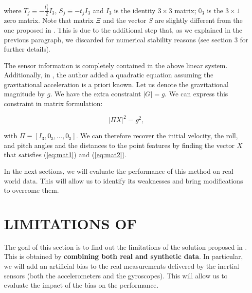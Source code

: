 \documentclass[letterpaper, 10 pt, conference]{ieeeconf}  %
\begin{document}
\noindent where $T_j \equiv - \frac{t^2_j}{2} I_3$, $S_j \equiv -t_j I_3$ and $I_3$ is the identity $3\times 3$ matrix; $0_3$ is the $3\times 1$ zero matrix.
Note that matrix $\Xi$ and the vector $S$ are slightly different from the one proposed in \cite{Martinelli2014}.
This is due to the additional step that, as we explained in the previous paragraph, we discarded for numerical stability reasons (see \cite{Martinelli2014} section 3 for further details).

The sensor information is completely contained in the above linear system. Additionally, in \cite{Martinelli2014}, the author added a quadratic equation assuming the gravitational acceleration is a priori known.
Let us denote the gravitational magnitude by $g$.
We have the extra constraint $|G| = g$. We can express this constraint in matrix formulation:

\begin{equation}
\label{eq:mat2}
| \Pi X | ^2 = g^2,
\end{equation}

\noindent with $\Pi \equiv [I_3, 0_3, ..., 0_3]$. We can therefore recover the initial velocity, the roll, and pitch angles and the distances to the point features
by finding the vector $X$ that satisfies (\ref{eq:mat1}) and (\ref{eq:mat2}).

In the next sections, we will evaluate the performance of this method on real world data.
This will allow us to identify its weaknesses and bring modifications to overcome them.





\section{LIMITATIONS OF \cite{Martinelli2014}}\label{SectionBottlenecks}

The goal of this section is to find out the limitations of the solution proposed in \cite{Martinelli2014}.
This is obtained by \textbf{combining both real and synthetic data}.
In particular, we will add an artificial bias to the real measurements delivered by the inertial sensors (both the accelerometers and the gyroscopes).
This will allow us to evaluate the impact of the bias on the performance.
\end{document}
